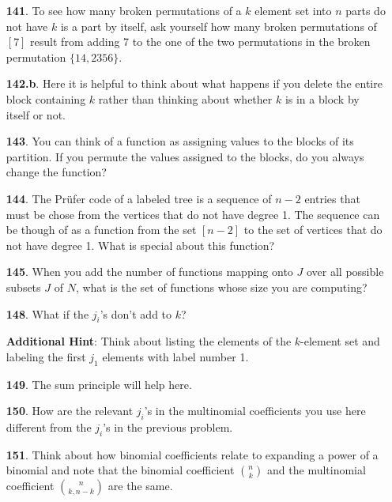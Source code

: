 \documentclass[10pt,]{book}
\theoremstyle{plain}
\theoremstyle{definition}
\theoremstyle{definition}
\numberwithin{equation}{chapter}
\begin{document}
\begin{itemize}[itemsep=1em]
\item[\textbf{141}.]\hypertarget{p-816}{}%
To see how many broken permutations of a \(k\) element set into \(n\) parts do not have \(k\) is a part by itself, ask yourself how many broken permutations of \([7]\) result from adding 7 to the one of the two permutations in the broken permutation \(\{14, 2356\}\).%

\item[\textbf{142.b}.]\hypertarget{p-822}{}%
Here it is helpful to think about what happens if you delete the entire block containing \(k\) rather than thinking about whether \(k\) is in a block by itself or not.%

\item[\textbf{143}.]\hypertarget{p-828}{}%
You can think of a function as assigning values to the blocks of its partition. If you permute the values assigned to the blocks, do you always change the function?%

\item[\textbf{144}.]\hypertarget{p-831}{}%
The Prüfer code of a labeled tree is a sequence of \(n-2\) entries that must be chose from the vertices that do not have degree 1. The sequence can be though of as a function from the set \([n-2]\) to the set of vertices that do not have degree 1. What is special about this function?%

\item[\textbf{145}.]\hypertarget{p-834}{}%
When you add the number of functions mapping onto \(J\) over all possible subsets \(J\) of \(N\), what is the set of functions whose size you are computing?%

\item[\textbf{148}.]\hypertarget{p-842}{}%
What if the \(j_i\)'s don't add to \(k\)?%

\par\smallskip
\noindent\textbf{Additional Hint}: \hypertarget{p-843}{}%
Think about listing the elements of the \(k\)-element set and labeling the first \(j_1\) elements with label number 1.%

\item[\textbf{149}.]\hypertarget{p-846}{}%
The sum principle will help here.%

\item[\textbf{150}.]\hypertarget{p-849}{}%
How are the relevant \(j_i\)'s in the multinomial coefficients you use here different from the \(j_i\)'s in the previous problem.%

\item[\textbf{151}.]\hypertarget{p-852}{}%
Think about how binomial coefficients relate to expanding a power of a binomial and note that the binomial coefficient \(\binom{n}{k}\) and the multinomial coefficient \(\binom{n}{k,n-k}\) are the same.%


\end{itemize}
\end{document}
